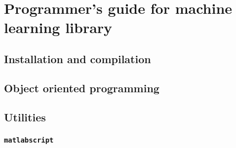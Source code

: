 


\chapter{Programmer's guide for machine learning library}

\section{Installation and compilation}

\section{Object oriented programming}

\section{Utilities}

\subsection{{\tt matlabscript}}



